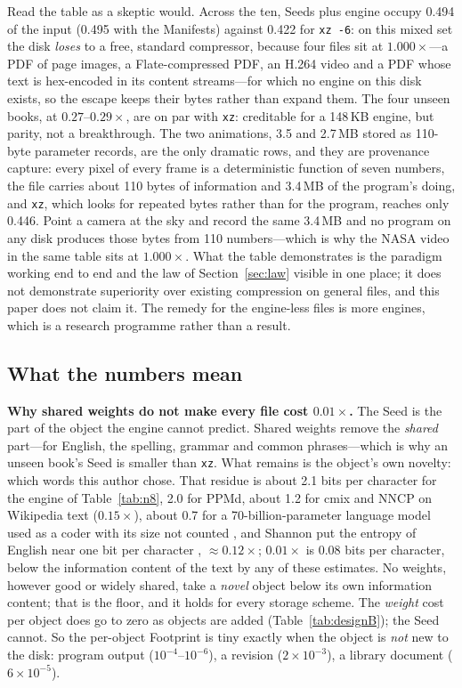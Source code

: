 \documentclass[11pt,a4paper]{article}
\theoremstyle{definition}
\theoremstyle{plain}
\theoremstyle{remark}
\begin{document}
Read the table as a skeptic would. Across the ten, Seeds plus engine occupy 0.494 of the input (0.495
with the Manifests) against 0.422 for \texttt{xz -6}: on this mixed set the disk \emph{loses} to a free, standard compressor,
because four files sit at $1.000\times$---a PDF of page images, a Flate-compressed PDF, an H.264
video and a PDF whose text is hex-encoded in its content streams---for which no engine on this
disk exists, so the escape keeps their bytes rather than expand them. The four unseen books, at
$0.27$--$0.29\times$, are on par with \texttt{xz}: creditable for a 148\,KB engine, but parity, not
a breakthrough. The two animations, 3.5 and 2.7\,MB stored as 110-byte parameter records, are
the only dramatic rows, and they are provenance capture: every pixel of every frame is a
deterministic function of seven numbers, the file carries about 110 bytes of information and
3.4\,MB of the program's doing, and \texttt{xz}, which looks for repeated bytes rather than for the
program, reaches only 0.446. Point a camera at the sky and record the same 3.4\,MB and no program
on any disk produces those bytes from 110 numbers---which is why the NASA video in the same table
sits at $1.000\times$. What the table demonstrates is the paradigm working end to end and the law
of Section~\ref{sec:law} visible in one place; it does not demonstrate superiority over existing
compression on general files, and this paper does not claim it. The remedy for the engine-less
files is more engines, which is a research programme rather than a result.

\subsection{What the numbers mean}
\label{sec:whynot}
\textbf{Why shared weights do not make every file cost $0.01\times$.} The Seed is the part of the
object the engine cannot predict. Shared weights remove the \emph{shared} part---for English, the
spelling, grammar and common phrases---which is why an unseen book's Seed is smaller than
\texttt{xz}. What remains is the object's own novelty: which words this author chose. That residue
is about 2.1 bits per character for the engine of Table~\ref{tab:n8}, 2.0 for PPMd, about 1.2
for cmix and NNCP on Wikipedia text ($0.15\times$), about 0.7 for a 70-billion-parameter language
model used as a coder with its size not counted \citep{deletang2023}, and Shannon put the entropy
of English near one bit per character \citep{shannon1951}, $\approx0.12\times$; $0.01\times$ is
0.08 bits per character, below the information content of the text by any of these estimates. No weights, however good or widely shared,
take a \emph{novel} object below its own information content; that is the floor, and it holds for
every storage scheme. The \emph{weight} cost per object does go to zero as objects are added
(Table~\ref{tab:designB}); the Seed cannot. So the per-object Footprint is tiny exactly when the
object is \emph{not} new to the disk: program output ($10^{-4}$--$10^{-6}$), a revision
($2\times10^{-3}$), a library document ($6\times10^{-5}$).
\end{document}
